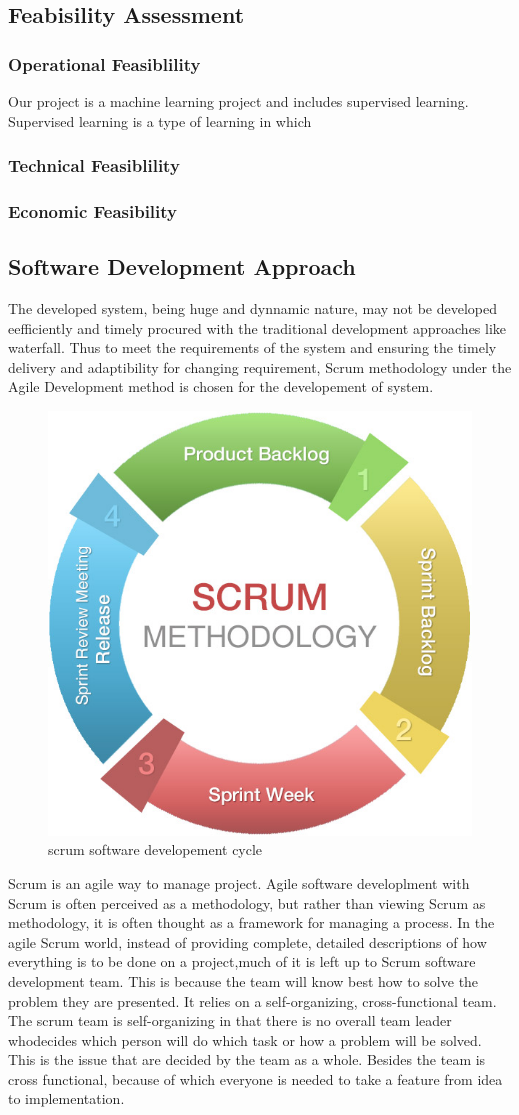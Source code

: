 \subsection{Feabisility Assessment}
\subsubsection{Operational Feasiblility}
Our project is a machine learning project and includes supervised learning. Supervised learning is a type of learning in which 

\subsubsection{Technical Feasiblility}


\subsubsection{Economic Feasibility}



\subsection{Software Development Approach}
The developed system, being huge and dynnamic nature, may not be developed eefficiently and timely procured with the traditional development approaches like waterfall. Thus to meet the requirements of the system and ensuring the timely delivery and adaptibility for changing requirement, Scrum methodology under the Agile Development method is chosen for the developement of system.


\begin{figure}[!ht]
\centering
\includegraphics[width = 5 cm]{fig/scrum-chart.jpg}
\caption{scrum software developement cycle}
\label{fig:scrum}
\end{figure}
Scrum is an agile way to manage project. Agile software developlment with Scrum is often perceived as a methodology, but rather than viewing Scrum as methodology, it is often thought as a framework for managing a process. In the agile Scrum world, instead of providing complete, detailed descriptions of how everything is to be done on a project,much of it is left up to Scrum software development team. This is because the team will know best how to solve the problem they are presented. It relies on a self-organizing, cross-functional team. The scrum team is self-organizing in that there is no overall team leader whodecides which person will do which task or how a problem will be solved. This is the issue that are decided by the team as a whole. Besides the team is cross functional, because of which everyone is needed to take a feature from idea to implementation. 

